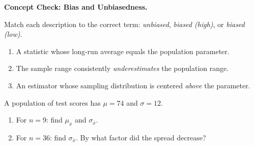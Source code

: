 \documentclass[10pt]{article}
\begin{document}
\namepartnerperiod

\vspace{0.1in}

\begin{tcolorbox}[colback=redbg, colframe=black!40, boxrule=0.6pt, arc=2mm,
    left=3mm, right=3mm, top=2mm, bottom=2mm, title=\textbf{Tier R --- Remediate}]
\textbf{Concept Check: Bias and Unbiasedness.}

Match each description to the correct term: \textit{unbiased}, \textit{biased (high)}, or \textit{biased (low)}.

\begin{enumerate}
  \item A statistic whose long-run average equals the population parameter.
  \item The sample range consistently \emph{underestimates} the population range.
  \item An estimator whose sampling distribution is centered \emph{above} the parameter.
\end{enumerate}

\medskip
A population of test scores has $\mu = 74$ and $\sigma = 12$.
\begin{enumerate}[resume]
  \item For $n = 9$: find $\mu_{\bar{x}}$ and $\sigma_{\bar{x}}$. \par\vspace{-\parskip}\nointerlineskip\noindent\begin{minipage}[t][0.5in][t]{\linewidth}\vspace*{2pt}\end{minipage}
  \item For $n = 36$: find $\sigma_{\bar{x}}$. By what factor did the spread decrease?
        \par\vspace{-\parskip}\nointerlineskip\noindent\begin{minipage}[t][0.5in][t]{\linewidth}\vspace*{2pt}\\
        \end{minipage}
\end{enumerate}
\end{tcolorbox}
\end{document}

